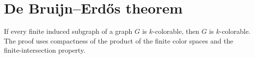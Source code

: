 \section{De Bruijn--Erd\H{o}s theorem}

\begin{theorem}
\label{thm:debruijn-erdos}
\leanok
If every finite induced subgraph of a graph $G$ is $k$-colorable, then $G$ is $k$-colorable. The proof uses compactness of the product of the finite color spaces and the finite-intersection property.
\end{theorem}
